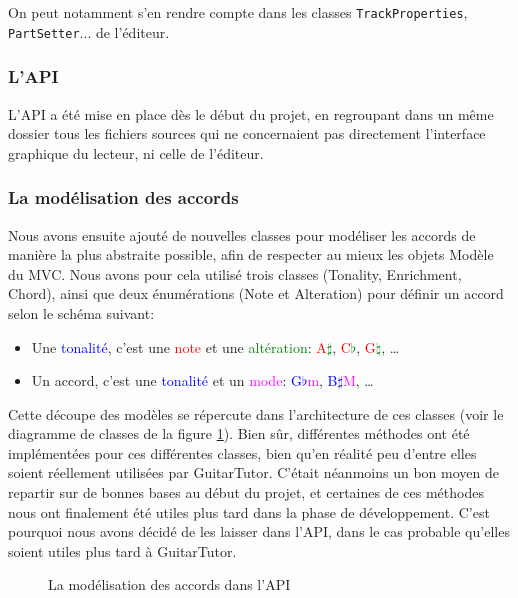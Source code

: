 On peut notamment s'en rendre compte dans les classes \texttt{TrackProperties}, \texttt{PartSetter}... de l'éditeur.
\subsubsection{L'\ac{API}}

L'\ac{API} a été mise en place dès le début du projet, en regroupant dans un même dossier tous les fichiers sources qui ne concernaient pas directement l'interface graphique du lecteur, ni celle de l'éditeur.

\subsubsection*{La modélisation des accords}

Nous avons ensuite ajouté de nouvelles classes pour modéliser les accords de manière la plus abstraite possible, afin de respecter au mieux les objets Modèle du \ac{MVC}. Nous avons pour cela utilisé trois classes (Tonality, Enrichment, Chord), ainsi que deux énumérations (Note et Alteration) pour définir un accord selon le schéma suivant:
\begin{itemize}
 \item Une \textcolor{blue}{tonalité}, c'est une \textcolor{red}{note} et une \textcolor{green}{altération}: \textcolor{red}{A}\textcolor{green}{$\sharp$}, \textcolor{red}{C}\textcolor{green}{$\flat$}, \textcolor{red}{G}\textcolor{green}{$\natural$}, \dots
 \item Un accord, c'est une \textcolor{blue}{tonalité} et un \textcolor{magenta}{mode}: \textcolor{blue}{G$\flat$}\textcolor{magenta}{m}, \textcolor{blue}{B$\sharp$}\textcolor{magenta}{M}, \dots
\end{itemize}

Cette découpe des modèles se répercute dans l'architecture de ces classes (voir le diagramme de classes de la figure \ref{diag_api_chords}). Bien sûr, différentes méthodes ont été implémentées pour ces différentes classes, bien qu'en réalité peu d'entre elles soient réellement utilisées par GuitarTutor. C'était néanmoins un bon moyen de repartir sur de bonnes bases au début du projet, et certaines de ces méthodes nous ont finalement été utiles plus tard dans la phase de développement. C'est pourquoi nous avons décidé de les laisser dans l'\ac{API}, dans le cas probable qu'elles soient utiles plus tard à GuitarTutor.

\begin{figure}[H]
\begin{center}
\caption{La modélisation des accords dans l'\ac{API}}
\label{diag_api_chords}
\end{center}
\end{figure}

